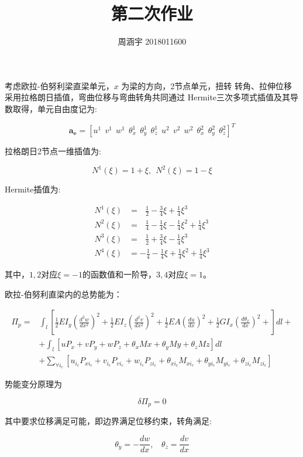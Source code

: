 \documentclass[UTF8,c5size]{ctexart}
\title{{\bfseries 第二次作业}}
\author{周涵宇 2018011600}
\date{}
\begin{document}
\maketitle

考虑欧拉-伯努利梁直梁单元，$x$ 为梁的方向，2节点单元，扭转
转角、拉伸位移采用拉格朗日插值，弯曲位移与弯曲转角共同通过
Hermite三次多项式插值及其导数取得，单元自由度记为:

\begin{equation}
\bm{a_e}=[u^1\ \ v^1\ \ w^1\ \ \theta^1_x\ \ \theta^1_y\ \ \theta^1_z
\ \ u^2\ \ v^2\ \ w^2\ \ \theta^2_x\ \ \theta^2_y\ \ \theta^2_z]^T
\end{equation}

拉格朗日2节点一维插值为:

\begin{equation}
N^1(\xi) = 1+\xi,\ \ N^2(\xi) = 1-\xi
\end{equation}

Hermite插值为:

\begin{equation}
\begin{split}
N^1(\xi)&=\ \ \ \frac{1}{2}-\frac{3}{4}\xi+\frac{1}{4}\xi^3\\
N^2(\xi)&=\ \ \ \frac{1}{4}-\frac{1}{4}\xi-\frac{1}{4}\xi^2+\frac{1}{4}\xi^3\\
N^3(\xi)&=\ \ \ \frac{1}{2}+\frac{3}{4}\xi-\frac{1}{4}\xi^3\\
N^4(\xi)&=-\frac{1}{4}-\frac{1}{4}\xi+\frac{1}{4}\xi^2+\frac{1}{4}\xi^3
\end{split}
\end{equation}

其中，$1,2$对应$\xi=-1$的函数值和一阶导，$3,4$对应$\xi=1$。

欧拉-伯努利直梁内的总势能为：

\begin{equation}
    \begin{split}
        \Pi_p=
            &\int_{l}{\left[
            \frac{1}{2}EI_y\left(\frac{d^2w}{dx^2}\right)^2+
            \frac{1}{2}EI_z\left(\frac{d^2v}{dx^2}\right)^2+
            \frac{1}{2}EA\left(\frac{du}{dx}\right)^2+
            \frac{1}{2}GI_x\left(\frac{d\theta_x}{dx}\right)^2+            
            \right]dl}+\\
            &+\int_{l}{\left[
                uP_x+vP_y+wP_z+\theta_xMx+\theta_yMy+\theta_zMz
                \right]dl}\\
            &+\sum_{\forall i_c}{\left[
            u_{i_c}P_{xi_c}+v_{i_c}P_{vi_c}+w_{i_c}P_{zi_c}
            +\theta_{xi_c}M_{xi_c}+\theta_{yi_c}M_{yi_c}+\theta_{zi_c}M_{zi_c}
            \right]}
    \end{split}
\end{equation}

势能变分原理为

$$
\delta\Pi_p=0
$$

其中要求位移满足可能，即边界满足位移约束，转角满足:

\begin{equation}
    \theta_y=-\frac{dw}{dx},\ \ \ \ \theta_z=\frac{dv}{dx}
\end{equation}





    
\end{document}
